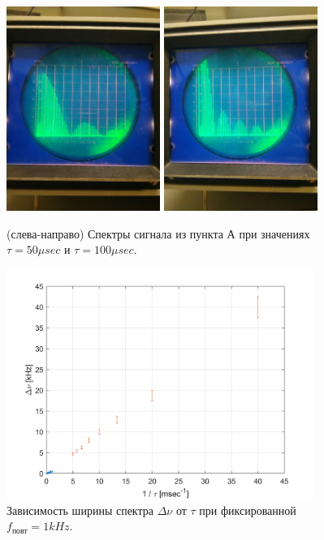 \documentclass[a4paper,12pt]{article}
\begin{document}
\begin{figure}[tpb]
\centering
\includegraphics[width=50mm]{Pictures/A3-50.jpg}
\includegraphics[width=50mm]{Pictures/A3-100.jpg}
\caption{(слева-направо) Спектры сигнала из пункта А при значениях $\tau = 50 \mu sec$ и $\tau = 100 \mu sec$.}
\label{A_4}
\end{figure}

\begin{figure}[tpb]
\centering
\includegraphics[width=100mm]{PlotA.png}
\caption{Зависимость ширины спектра $\Delta \nu$ от $\tau$ при фиксированной $f_\text{повт} = 1 kHz$.}
\label{A_5}
\end{figure}
\end{document}
